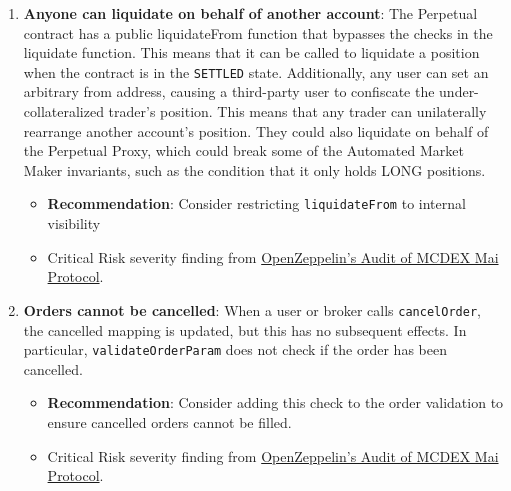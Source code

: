 \begin{enumerate}
\item\textbf{Anyone can liquidate on behalf of another account}: The Perpetual contract has a public liquidateFrom function that bypasses the checks in the liquidate function. This means that it can be called to liquidate a position when the contract is in the \verb|SETTLED| state. Additionally, any user can set an arbitrary from address, causing a third-party user to confiscate the under-collateralized trader’s position. This means that any trader can unilaterally rearrange another account’s position. They could also liquidate on behalf of the Perpetual Proxy, which could break some of the Automated Market Maker invariants, such as the condition that it only holds LONG positions.
	\begin{itemize}
	\item\textbf{Recommendation}: Consider restricting \verb|liquidateFrom| to internal visibility
	\item Critical Risk severity finding from \href{https://blog.openzeppelin.com/mcdex-mai-protocol-audit/}{OpenZeppelin’s Audit of MCDEX Mai Protocol}.
	\end{itemize}

\item\textbf{Orders cannot be cancelled}: When a user or broker calls \verb|cancelOrder|, the cancelled mapping is updated, but this has no subsequent effects. In particular, \verb|validateOrderParam| does not check if the order has been cancelled.
	\begin{itemize}
	\item\textbf{Recommendation}: Consider adding this check to the order validation to ensure cancelled orders cannot be filled.
	\item Critical Risk severity finding from \href{https://blog.openzeppelin.com/mcdex-mai-protocol-audit/}{OpenZeppelin’s Audit of MCDEX Mai Protocol}.
	\end{itemize}


\end{enumerate}
